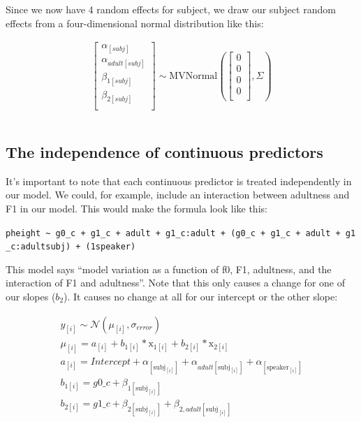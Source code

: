 \documentclass[
]{book}
\begin{document}
Since we now have 4 random effects for subject, we draw our subject random effects from a four-dimensional normal distribution like this:

\begin{equation}
\begin{split}
\begin{bmatrix} \alpha_{[subj]} \\ \alpha_{adult[subj]} \\ \beta_{1[subj]} \\ \beta_{2[subj]} \\ \end{bmatrix}  
\sim \mathrm{MVNormal} ( \begin{bmatrix} 0 \\ 0 \\ 0 \\ 0 \\ \end{bmatrix}, \Sigma) \\ \\
\end{split}
\label{eq:615}
\end{equation}

\hypertarget{the-independence-of-continuous-predictors}{%
\subsection{The independence of continuous predictors}\label{the-independence-of-continuous-predictors}}

It's important to note that each continuous predictor is treated independently in our model. We could, for example, include an interaction between adultness and F1 in our model. This would make the formula look like this:

\texttt{pheight\ \textasciitilde{}\ g0\_c\ +\ g1\_c\ +\ adult\ +\ g1\_c:adult\ +\ (g0\_c\ +\ g1\_c\ +\ adult\ +\ g1\_c:adult\textbar{}subj)\ +\ (1\textbar{}speaker)}

This model says ``model variation as a function of f0, F1, adultness, and the interaction of F1 and adultness''. Note that this only causes a change for one of our slopes (\(b_2\)). It causes no change at all for our intercept or the other slope:

\begin{equation}
\begin{split}
y_{[i]} \sim \mathcal{N}(\mu_{[i]},\sigma_{error}) \\
\mu_{[i]} = a_{[i]} + b_{1[i]} * \mathrm{x}_{1[i]} + b_{2[i]} * \mathrm{x}_{2[i]}  \\ 
a_{[i]} = Intercept + \alpha_{[\mathrm{subj}_{[i]}]} + \alpha_{adult[\mathrm{subj}_{[i]}]} + \alpha_{[\mathrm{speaker}_{[i]}]}  \\
b_{1[i]} =  g0\_c + \beta_{1{[\mathrm{subj}_{[i]}]}} \\ 
b_{2[i]} =  g1\_c + \beta_{2{[\mathrm{subj}_{[i]}]}} + \beta_{2,adult[\mathrm{subj}_{[i]}]} \\ 
\end{split}
\label{eq:616}
\end{equation}
\end{document}
